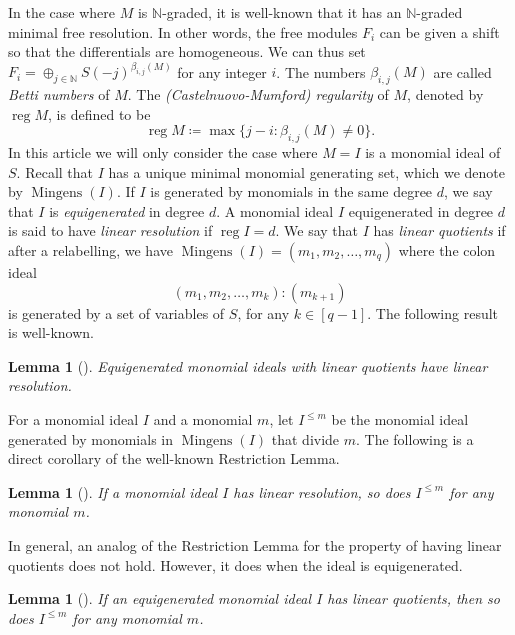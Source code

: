 \documentclass{amsart}
\newtheorem{lemma}[theorem]{Lemma}
\theoremstyle{remark}
\theoremstyle{definition}
\DeclareMathOperator{\reg}{reg}
\DeclareMathOperator{\mingens}{Mingens}
\begin{document}
	In the case where $M$ is $\mathbb{N}$-graded, it is well-known that it has an $\mathbb{N}$-graded minimal free resolution. In other words, the free modules $F_i$ can be given a shift so that the differentials are homogeneous. We can thus set $F_i=\oplus_{j\in \mathbb{N}} S(-j)^{\beta_{i,j}(M)}$ for any integer $i$. The numbers $\beta_{i,j}(M)$ are called \emph{Betti numbers} of $M$. The \emph{(Castelnuovo-Mumford) regularity} of $M$, denoted by $\reg M$, is defined to be
	\[
	\reg M\coloneqq \max \{ j - i \colon \beta_{i,j}(M)\neq 0 \}.
	\]
	In this article we will only consider the case where $M=I$ is a monomial ideal of $S$. Recall that $I$ has a unique minimal monomial generating set, which we denote by $\mingens(I)$. If $I$ is generated by monomials in the same degree $d$, we say that $I$ is \emph{equigenerated} in degree $d$. A monomial ideal $I$ equigenerated in degree $d$ is said to have \emph{linear resolution} if $\reg I = d$. We say that $I$ has \emph{linear quotients} if after a relabelling, we have $\mingens(I)=(m_1, m_2,\dots, m_q)$ where the colon ideal
	\[
	(m_1,m_2,\dots, m_k)\colon (m_{k+1}) 
	\]
	is generated by a set of variables of $S$, for any $k\in [q-1]$. The following result is well-known.
	
	\begin{lemma}[{\cite[Theorem 8.2.15]{HerzogHibiBook}}]\label{lem:LQ-implies-LR}
		Equigenerated monomial ideals with linear quotients have linear resolution.
	\end{lemma}
	
	For a monomial ideal $I$ and a monomial $m$, let $I^{\leq m}$ be the monomial ideal generated by monomials in $\mingens(I)$ that divide $m$. The following is a direct corollary of the well-known Restriction Lemma.
	
	\begin{lemma}[{\cite[Lemma 4.1]{HHZ2004}}]\label{lem:linear-resolution-induced}
		If a monomial ideal $I$ has linear resolution, so does $I^{\leq m}$ for any monomial $m$.
	\end{lemma}
	
	In general, an analog of the Restriction Lemma for the property of having linear quotients does not hold. However, it does when the ideal is equigenerated.
	
	\begin{lemma}[{\cite[Proposition 2.6]{HMRG20}}]\label{lem:linear-quotients-restriction}
		If an equigenerated monomial ideal $I$ has linear quotients, then so does $I^{\leq m}$ for any monomial $m$.
	\end{lemma}
	
\end{document}
